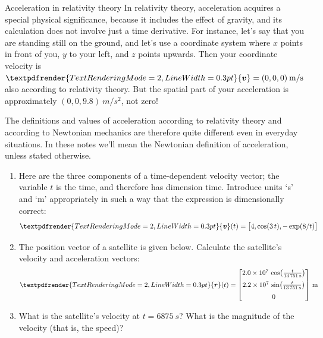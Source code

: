 \documentclass[a4paper,12pt,%
onecolumn,oneside,%
british%
]{memoir}
\renewcommand*{\bm}[1]{\textpdfrender{TextRenderingMode=2,LineWidth=0.3pt}{\boldsymbol{#1}}}
\renewcommand*{\|}[1][]{\nonscript\:#1\vert\nonscript\:\mathopen{}}
\newcommand*{\yr}{\bm{r}}
\newcommand*{\yv}{\bm{v}}
\begin{document}
\begin{extra}{Acceleration in relativity theory}
  In relativity theory, acceleration acquires a special physical significance, because it includes the effect of gravity, and its calculation does not involve just a time derivative. For instance, let's say that you are standing still on the ground, and let's use a coordinate system where $x$ points in front of you, $y$ to your left, and $z$ points upwards. Then your coordinate velocity is $\yv=(0,0,0)\:\unit{m/s}$ also according to relativity theory. But the spatial part of your acceleration is approximately $(0,0,9.8)\:\unit{m/s^{2}}$, not zero!

  The definitions and values of acceleration according to relativity theory and according to Newtonian mechanics are therefore quite different even in everyday situations. In these notes we'll mean the Newtonian definition of acceleration, unless stated otherwise.
\end{extra}

\medskip

\begin{exercise}
  \begin{enumerate}[exerc]
  \item Here are the three components of a time-dependent velocity vector; the variable $t$ is the time, and therefore has dimension \textsf{time}. Introduce units \enquote*{\unit{s}} and \enquote*{\unit{m}} appropriately in such a way that the expression is dimensionally correct:
    \begin{equation*}
      \bm{v}(t) = \bigl[4, \cos(3\,t), -\exp(8/t)\bigr]
    \end{equation*}
  \item The position vector of a satellite is given below. Calculate the satellite's velocity and acceleration vectors:
    \begin{equation*}
      \yr(t) =
      \begin{bmatrix}
        \num[exponent-mode=scientific]{20e+6}\,
        \cos\bigl(\frac{t}{\qty{13751}{s}}\bigr)\\[2\jot]
        \num[exponent-mode=scientific]{22e+6}\,
        \sin\bigl(\frac{t}{\qty{13751}{s}}\bigr)\\[2\jot]
        \num{0}
      \end{bmatrix}\:\unit{m}
    \end{equation*}
  \item What is the satellite's velocity at $t=\qty{6875}{s}$? What is the magnitude of the velocity (that is, the speed)?
  \end{enumerate}
\end{exercise}
\end{document}
